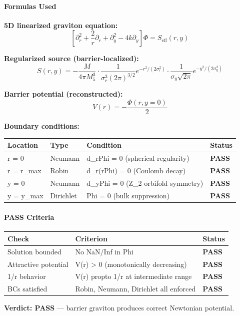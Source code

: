 \documentclass[
  11pt,
]{article}
\begin{document}
\bigskip

\hypertarget{formulas-used-1}{%
\paragraph{Formulas Used}\label{formulas-used-1}}

\textbf{5D linearized graviton equation:}
\[\left[\partial_r^2 + \frac{2}{r}\partial_r + \partial_y^2 - 4k\partial_y\right]\Phi = S_\text{eff}(r,y) \tag{108}\]

\textbf{Regularized source (barrier-localized):}
\[S(r,y) = -\frac{M}{4\pi M_5^3} \cdot \frac{1}{\sigma_r^3(2\pi)^{3/2}} e^{-r^2/(2\sigma_r^2)} \cdot \frac{1}{\sigma_y\sqrt{2\pi}} e^{-y^2/(2\sigma_y^2)} \tag{109}\]

\textbf{Barrier potential (reconstructed):}
\[V(r) = -\frac{\Phi(r, y=0)}{2} \tag{110}\]

\textbf{Boundary conditions:}

\begin{longtable}[]{@{}llll@{}}
\toprule
Location & Type & Condition & Status\tabularnewline
\midrule
\endhead
r = 0 & Neumann & d\_rPhi = 0 (spherical regularity) &
\textbf{PASS}\tabularnewline
r = r\_max & Robin & d\_r(rPhi) = 0 (Coulomb decay) &
\textbf{PASS}\tabularnewline
y = 0 & Neumann & d\_yPhi = 0 (Z\_2 orbifold symmetry) &
\textbf{PASS}\tabularnewline
y = y\_max & Dirichlet & Phi = 0 (bulk suppression) &
\textbf{PASS}\tabularnewline
\bottomrule
\end{longtable}

\bigskip

\hypertarget{pass-criteria-1}{%
\paragraph{PASS Criteria}\label{pass-criteria-1}}

\begin{longtable}[]{@{}lll@{}}
\toprule
Check & Criterion & Status\tabularnewline
\midrule
\endhead
Solution bounded & No NaN/Inf in Phi & \textbf{PASS}\tabularnewline
Attractive potential & V(r) \textgreater{} 0 (monotonically decreasing)
& \textbf{PASS}\tabularnewline
1/r behavior & V(r) propto 1/r at intermediate range &
\textbf{PASS}\tabularnewline
BCs satisfied & Robin, Neumann, Dirichlet all enforced &
\textbf{PASS}\tabularnewline
\bottomrule
\end{longtable}

\textbf{Verdict: PASS} --- barrier graviton produces correct Newtonian
potential.
\end{document}
